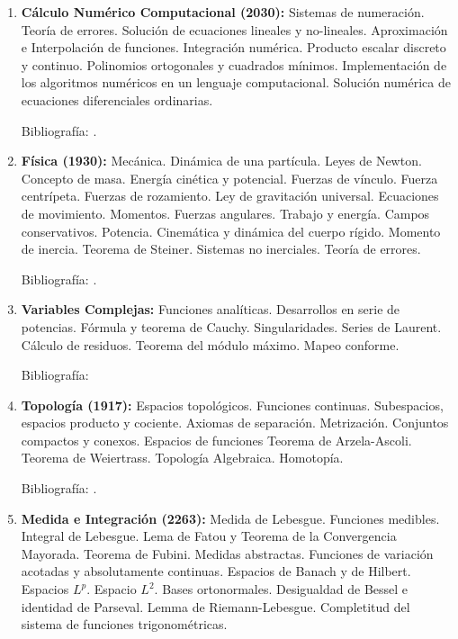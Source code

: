 \documentclass[a4paper, 12pt]{article}
\begin{document}
\begin{enumerate}
\item\textbf{Cálculo Numérico Computacional (2030):} Sistemas de numeración.
Teoría de errores. Solución de ecuaciones lineales y no-lineales.
Aproximación e Interpolación de funciones. Integración numérica.
Producto escalar discreto y continuo. Polinomios ortogonales y
cuadrados mínimos. Implementación de los algoritmos numéricos en
un lenguaje computacional. Solución numérica de ecuaciones diferenciales ordinarias.

Bibliografía: \cite{burden, cheney}.









\item\textbf{Física (1930):} Mecánica. Dinámica de una partícula. Leyes
de Newton. Concepto de masa. Energía cinética y potencial. Fuerzas
de vínculo. Fuerza centrípeta. Fuerzas de rozamiento. Ley de
gravitación universal. Ecuaciones de movimiento. Momentos. Fuerzas
angulares. Trabajo y energía. Campos conservativos.
Potencia. Cinemática y  dinámica del cuerpo rígido. Momento de
inercia. Teorema de Steiner. Sistemas no inerciales. Teoría de
errores.

Bibliografía: \cite{roederer, sears}.


\item\textbf{Variables Complejas:}
Funciones analíticas. Desarrollos en serie de potencias. Fórmula
y teorema de Cauchy. Singularidades. Series de Laurent. Cálculo de
residuos. Teorema del módulo máximo. Mapeo conforme.

Bibliografía: \cite{ahlfors, churchill,conway}



\item\textbf{Topología (1917):}  Espacios topológicos. Funciones continuas. Subespacios, espacios producto
y cociente. Axiomas de separación. Metrización.
Conjuntos compactos y conexos. Espacios de funciones Teorema de Arzela-Ascoli. Teorema de Weiertrass. 
 Topología Algebraica. Homotopía.

Bibliografía: \cite{dugundji, kelley,
munkres, morris1989topology,  JohnMcCleary84,StefanWaldmann87,JohnB.Conway251, RobertAConover507}.


\item\textbf{Medida e Integración (2263):}  Medida de Lebesgue. Funciones medibles.
Integral de
Lebesgue. Lema de Fatou y Teorema de la Convergencia Mayorada.
Teorema de Fubini. Medidas abstractas.  Funciones de variación acotadas y absolutamente continuas.   Espacios de Banach y de Hilbert. Espacios
$L^p$. Espacio  $L^2$. Bases ortonormales. 
Desigualdad de Bessel e identidad de Parseval. Lemma de Riemann-Lebesgue. Completitud del sistema de funciones trigonométricas.


\end{enumerate}
\end{document}

